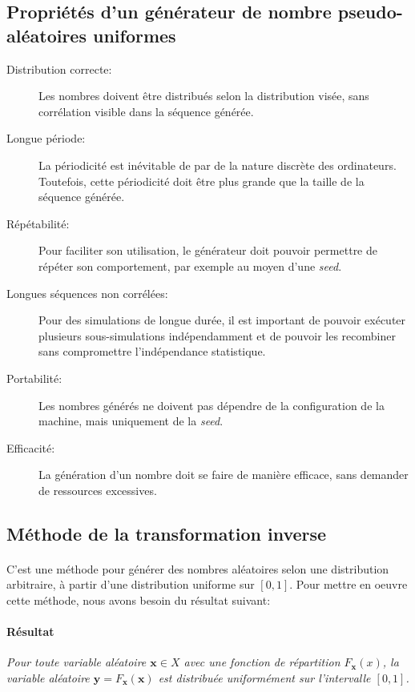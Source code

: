 \documentclass[a4paper]{article}
\begin{document}
\subsection{Propriétés d'un générateur de nombre pseudo-aléatoires uniformes}
\begin{description}
	\item[Distribution correcte:]Les nombres doivent être distribués
		selon la distribution visée, sans corrélation visible dans la
		séquence générée.
	\item[Longue période:] La périodicité est inévitable de par de la
		nature discrète des ordinateurs. Toutefois, cette périodicité
		doit être plus grande que la taille de la séquence générée.
	\item[Répétabilité:]Pour faciliter son utilisation, le générateur
		doit pouvoir permettre de répéter son comportement, par exemple
		au moyen d'une \emph{seed}.
	\item[Longues séquences non corrélées:]Pour des simulations de
		longue durée, il est important de pouvoir exécuter plusieurs
		sous-simulations indépendamment et de pouvoir les recombiner
		sans compromettre l'indépendance statistique.
	\item[Portabilité:]Les nombres générés ne doivent pas dépendre de la
		configuration de la machine, mais uniquement de la \emph{seed}.
	\item[Efficacité:]La génération d'un nombre doit se faire de manière
		efficace, sans demander de ressources excessives.
\end{description}

\subsection{Méthode de la transformation inverse}
\paragraph{}
C'est une méthode pour générer des nombres aléatoires
selon une distribution arbitraire, à partir d'une distribution uniforme
sur \([0,1]\). Pour mettre en oeuvre cette méthode, nous avons besoin du
résultat suivant:
\paragraph{Résultat}
\emph{Pour toute variable aléatoire \(\mathbf x\in X\) avec une fonction
de répartition \(F_{\mathbf x}(x)\), la variable aléatoire
\(\mathbf y=F_{\mathbf x}(\mathbf x)\) est distribuée uniformément sur
l'intervalle \([0,1]\).}
\end{document}
